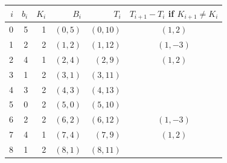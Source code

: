 \begin{tabular}{@{}r rrrr c@{}}
\toprule $i$ & $b_i$ & $K_i$ & $B_i$ & $T_i$ & $T_{i+1}-T_i$ if $K_{i+1}\ne K_i$\\\midrule
0 & 5 & 1 & $(0,5)$ & $(0,10)$ & $(1,2)$\\
1 & 2 & 2 & $(1,2)$ & $(1,12)$ & $(1,-3)$\\
2 & 4 & 1 & $(2,4)$ & $(2,9)$ & $(1,2)$\\
3 & 1 & 2 & $(3,1)$ & $(3,11)$ & \\
4 & 3 & 2 & $(4,3)$ & $(4,13)$ & \\
5 & 0 & 2 & $(5,0)$ & $(5,10)$ & \\
6 & 2 & 2 & $(6,2)$ & $(6,12)$ & $(1,-3)$\\
7 & 4 & 1 & $(7,4)$ & $(7,9)$ & $(1,2)$\\
8 & 1 & 2 & $(8,1)$ & $(8,11)$ & \\
\bottomrule\end{tabular}